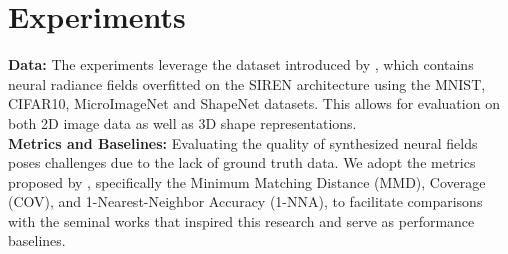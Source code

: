 \section{Experiments}
\label{sec:exper}
\textbf{Data: }
The experiments leverage the dataset introduced by \cite{papa2023train}, which contains neural radiance fields overfitted on the SIREN architecture using the MNIST, CIFAR10, MicroImageNet and ShapeNet datasets. This allows for evaluation on both 2D image data as well as 3D shape representations. \\
\textbf{Metrics and Baselines: }
Evaluating the quality of synthesized neural fields poses challenges due to the lack of ground truth data. We adopt the metrics proposed by \cite{erkoç2023hyperdiffusion}, specifically the Minimum Matching Distance (MMD), Coverage (COV), and 1-Nearest-Neighbor Accuracy (1-NNA), to facilitate comparisons with the seminal works that inspired this research and serve as performance baselines. \\